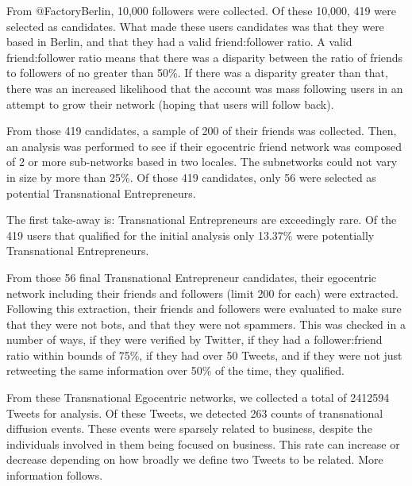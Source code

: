 From @FactoryBerlin, 10,000 followers were collected. Of these 10,000,
419 were selected as candidates. What made these users candidates was
that they were based in Berlin, and that they had a valid
friend:follower ratio. A valid friend:follower ratio means that there
was a disparity between the ratio of friends to followers of no
greater than 50\%. If there was a disparity greater than that, there
was an increased likelihood that the account was mass following users
in an attempt to grow their network (hoping that users will follow
back).

From those 419 candidates, a sample of 200 of their friends was
collected. Then, an analysis was performed to see if their egocentric
friend network was composed of 2 or more sub-networks based in two
locales.  The subnetworks could not vary in size by more than 25\%. Of
those 419 candidates, only 56 were selected as potential Transnational
Entrepreneurs.

The first take-away is: Transnational Entrepreneurs are exceedingly
rare. Of the 419 users that qualified for the initial analysis only
13.37\% were potentially Transnational Entrepreneurs.

From those 56 final Transnational Entrepreneur candidates, their
egocentric network including their friends and followers (limit 200
for each) were extracted. Following this extraction, their friends and
followers were evaluated to make sure that they were not bots, and that
they were not spammers. This was checked in a number of ways, if they
were verified by Twitter, if they had a follower:friend ratio within
bounds of 75\%, if they had over 50 Tweets, and if they were not just
retweeting the same information over 50\% of the time, they qualified.

From these Transnational Egocentric networks, we collected a total of
2412594 Tweets for analysis. Of these Tweets, we detected 263 counts
of transnational diffusion events. These events were sparsely related
to business, despite the individuals involved in them being focused on
business. This rate can increase or decrease depending on how broadly
we define two Tweets to be related. More information follows.

